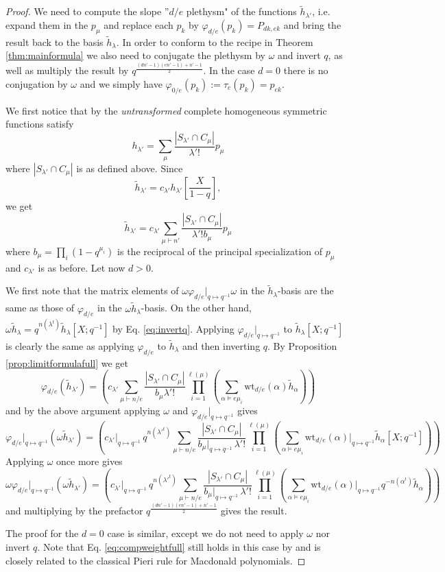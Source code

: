\documentclass{amsart}
\numberwithin{equation}{section}
\theoremstyle{definition}
\def\tilde{\widetilde}
\renewcommand{\th}{\tilde{h}}
\newcommand{\wt}{\mathrm{wt}}
\begin{document}
\begin{proof}
We need to compute the slope ''$d/e$ plethysm" of the functions $\th_{\lambda'}$, i.e. expand them in the $p_{\mu}$ and replace each $p_k$ by $\varphi_{d/e}(p_k)=P_{dk,ek}$ and bring the result back to the basis $\th_\lambda$.  In order to conform to the recipe in Theorem \ref{thm:mainformula} we also need to conjugate the plethysm by $\omega$ and invert $q$, as well as multiply the result by $q^{\frac{(dn'-1)(en'-1)+n'-1}{2}}$. In the case $d=0$ there is no conjugation by $\omega$ and we simply have $\varphi_{0/e}(p_k):=\tau_e(p_k)=p_{ek}$. 


We first notice that by \cite{ReEc} the {\em untransformed} complete homogeneous symmetric functions satisfy 
$$h_{\lambda'}=\sum_\mu \frac{|S_{\lambda'}\cap C_\mu|}{\lambda'!}p_\mu$$ where $|S_{\lambda'}\cap C_\mu|$ is as defined above.
Since $$\th_{\lambda'}=c_{\lambda'} h_{\lambda'}\left[\frac{X}{1-q}\right],$$
we get
$$\th_{\lambda'}=c_{\lambda'} \sum_{\mu\vdash n'} \frac{|S_{\lambda'}\cap C_\mu|}{\lambda'! b_\mu} p_\mu$$
where $b_\mu=\prod_i (1-q^{\mu_i})$ is the reciprocal of the principal specialization of $p_\mu$ and $c_{\lambda'}$ is as before.
Let now $d>0$. 

We first note that the matrix elements of $\omega \varphi_{d/e}|_{q\mapsto q^{-1}} \omega$ in the $\th_\lambda$-basis are the same as those of $\varphi_{d/e}$ in the $\omega \th_\lambda$-basis. On the other hand, $\omega\th_\lambda=q^{n(\lambda^t)}\th_\lambda[X;q^{-1}]$ by Eq. \eqref{eq:invertq}. Applying $\varphi_{d/e}|_{q\mapsto q^{-1}}$ to $\th_\lambda[X;q^{-1}]$ is clearly the same as applying $\varphi_{d/e}$ to $\th_\lambda$ and then inverting $q$. By Proposition \ref{prop:limitformulafull} we get $$\varphi_{d/e}(\th_{\lambda'})=\left(c_{\lambda'}\sum_{\mu\vdash n/e} \frac{|S_{\lambda'}\cap C_\mu|}{b_\mu \lambda'!}\prod_{i=1}^{\ell(\mu)}(\sum_{\alpha\vDash e\mu_i} \wt_{d/e}(\alpha)\th_\alpha)\right)$$ and by the above argument applying $\omega$ and $\varphi_{d/e}|_{q\mapsto q^{-1}}$ gives
 $$\varphi_{d/e}|_{q\mapsto q^{-1}}(\omega \th_{\lambda'})=\left(c_{\lambda'}|_{q\mapsto q^{-1}}\,q^{n({\lambda'}^t)}\sum_{\mu\vdash n/e} \frac{|S_{\lambda'}\cap C_\mu|}{b_\mu|_{q\mapsto q^{-1}}\, \lambda'!}\prod_{i=1}^{\ell(\mu)}(\sum_{\alpha\vDash e\mu_i} \wt_{d/e}(\alpha)|_{q\mapsto q^{-1}}\th_\alpha[X;q^{-1}])\right)$$
Applying $\omega$ once more gives
$$\omega \varphi_{d/e}|_{q\mapsto q^{-1}}(\omega \th_{\lambda'})=\left(c_{\lambda'}|_{q\mapsto q^{-1}}\,q^{n({\lambda'}^t)}\sum_{\mu\vdash n/e} \frac{|S_{\lambda'}\cap C_\mu|}{b_\mu|_{q\mapsto q^{-1}}\, \lambda'!}\prod_{i=1}^{\ell(\mu)}(\sum_{\alpha\vDash e\mu_i} \wt_{d/e}(\alpha)|_{q\mapsto q^{-1}}q^{-n(\alpha^t)}\th_\alpha)\right)$$
and multiplying by the prefactor $q^{\frac{(dn'-1)(en'-1)+n'-1}{2}}$ gives the result.

The proof for the $d=0$ case is similar, except we do not need to apply $\omega$ nor invert $q$. Note that Eq. \eqref{eq:compweightfull} still holds in this case by \cite{NegutPieri} and is closely related to the classical Pieri rule for Macdonald polynomials.
\end{proof}
\end{document}
